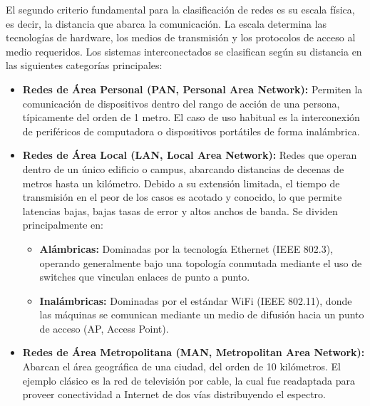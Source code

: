 El segundo criterio fundamental para la clasificación de redes es su escala física, es decir, la distancia que abarca la comunicación. La escala determina las tecnologías de hardware, los medios de transmisión y los protocolos de acceso al medio requeridos. Los sistemas interconectados se clasifican según su distancia en las siguientes categorías principales:

\begin{itemize}
  \item \textbf{Redes de Área Personal (PAN, Personal Area Network):} 
  Permiten la comunicación de dispositivos dentro del rango de acción de una persona, típicamente del orden de 1 metro. El caso de uso habitual es la interconexión de periféricos de computadora o dispositivos portátiles de forma inalámbrica.

  \item \textbf{Redes de Área Local (LAN, Local Area Network):} 
  Redes que operan dentro de un único edificio o campus, abarcando distancias de decenas de metros hasta un kilómetro. Debido a su extensión limitada, el tiempo de transmisión en el peor de los casos es acotado y conocido, lo que permite latencias bajas, bajas tasas de error y altos anchos de banda. Se dividen principalmente en:
  \begin{itemize}
    \item \textbf{Alámbricas:} Dominadas por la tecnología Ethernet (IEEE 802.3), operando generalmente bajo una topología conmutada mediante el uso de switches que vinculan enlaces de punto a punto.
    \item \textbf{Inalámbricas:} Dominadas por el estándar WiFi (IEEE 802.11), donde las máquinas se comunican mediante un medio de difusión hacia un punto de acceso (AP, Access Point).
  \end{itemize}

  \item \textbf{Redes de Área Metropolitana (MAN, Metropolitan Area Network):} 
  Abarcan el área geográfica de una ciudad, del orden de 10 kilómetros. El ejemplo clásico es la red de televisión por cable, la cual fue readaptada para proveer conectividad a Internet de dos vías distribuyendo el espectro.


\end{itemize}
